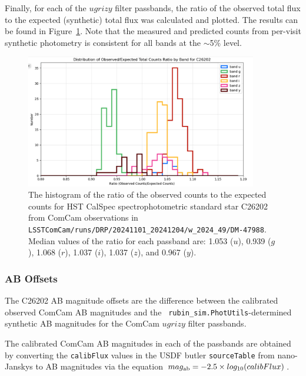 Finally, for each of the $ugrizy$ filter passbands, the ratio of the
observed total flux to the expected (synthetic) total flux was
calculated and plotted.  The results can be found in
Figure~\ref{fig:c26202_throughputs}.  Note that the measured and
predicted counts from per-visit synthetic photometry is consistent for
all bands at the $\sim$5\% level.

\begin{figure}
  \begin{center}
    \includegraphics[width=0.9\textwidth]{photometric_calibration_figures/LSSTComCam_Absolute_Throughputs_20241210.png}
  \end{center}
  \caption{\label{fig:c26202_throughputs}The histogram of the ratio of
    the observed counts to the expected counts for HST CalSpec
    spectrophotometric standard star C26202 from ComCam observations
    in {\tt
      LSSTComCam/runs/DRP/20241101\_20241204/w\_2024\_49/DM-47988}.
    Median values of the ratio for each passband are: 1.053 ($u$),
    0.939 ($g$), 1.068 ($r$), 1.037 ($i$), 1.037 ($z$), and 0.967
    ($y$).}
\end{figure}


\subsubsection{AB Offsets}

The C26202 AB magnitude offsets are the difference between the
calibrated observed ComCam AB magnitudes and the {\tt
  rubin\_sim.PhotUtils}-determined synthetic AB magnitudes for the
ComCam $ugrizy$ filter passbands.

The calibrated ComCam AB magnitudes in each of the passbands are
obtained by converting the {\tt calibFlux} values in the USDF butler
{\tt sourceTable} from nano-Janskys to AB magnitudes via the equation
$mag_{\rm ab} = -2.5 \times log_{10}(calibFlux)$.

